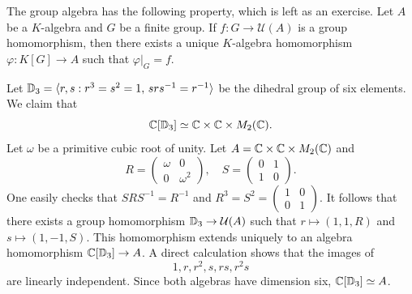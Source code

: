 The group algebra has the following property, which is left as an exercise.
Let $A$ be a $K$-algebra and $G$ be a finite group. If $f\colon
G\to\mathcal{U}(A)$ is a group homomorphism, then there exists a unique
$K$-algebra homomorphism $\varphi\colon K[G]\to A$ such that $\varphi|_G=f$. 

\begin{example}
	Let $\mathbb{D}_3=\langle r,s:r^3=s^2=1,\,srs^{-1}=r^{-1}\rangle$ be the dihedral
	group of six elements. We claim that 
	\[
	\mathbb{C}[\mathbb{D}_3]\simeq\mathbb{C}\times\mathbb{C}\times M_2(\mathbb{C}).
	\]
  Let 	
  $\omega$ be a primitive cubic root of unity. Let 
  $A=\mathbb{C}\times\mathbb{C}\times M_2(\mathbb{C})$ and  
	\[
	R=\begin{pmatrix}
		\omega&0\\
		0&\omega^2	
	\end{pmatrix},
	\quad
	S=\begin{pmatrix}
		0&1\\
		1&0
	\end{pmatrix}.
 	\]
 	One easily checks that $SRS^{-1}=R^{-1}$ and $R^3=S^2=\begin{pmatrix}
		1&0\\
		0&1	
	\end{pmatrix}$. It follows that there exists a group homomorphism
  $\mathbb{D}_3\to\mathcal{U}(A)$ such that 
	$r\mapsto (1,1,R)$ and $s\mapsto (1,-1,S)$. This homomorphism
  extends uniquely to an algebra homomorphism $\mathbb{C}[\mathbb{D}_3]\to A$.  
  A direct calculation shows that the images of
  \[
  1,r,r^2,s,rs,r^2s
  \]
  are linearly independent. Since both algebras have dimension six,
  $\mathbb{C}[\mathbb{D}_3]\simeq A$. 
\end{example}


